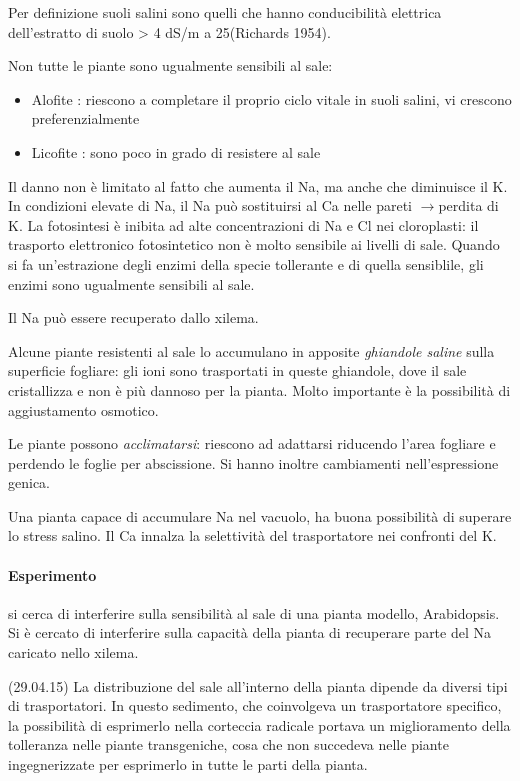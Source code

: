 \documentclass[a4paper,12pt]{book}
\newcommand{\lfreccia}{\ensuremath{\longrightarrow}}
\begin{document}
Per definizione suoli salini sono quelli che hanno
conducibilità elettrica dell’estratto di suolo > 4 dS/m
a 25\textcelsius (Richards 1954).

Non tutte le piante sono ugualmente sensibili al sale: 
\begin{itemize}
\item{Alofite : riescono a completare il proprio ciclo vitale in suoli salini, vi crescono preferenzialmente}
\item{Licofite : sono poco in grado di resistere al sale}
\end{itemize}

Il danno non è limitato al fatto che aumenta il Na, ma anche che diminuisce il K. In condizioni elevate di Na, il Na può sostituirsi al Ca nelle pareti \lfreccia perdita di K. La fotosintesi è inibita ad alte concentrazioni di Na e Cl nei cloroplasti: il trasporto elettronico fotosintetico non è molto sensibile ai livelli di sale. Quando si fa un'estrazione degli enzimi della specie tollerante e di quella sensiblile, gli enzimi sono ugualmente sensibili al sale.

Il Na può essere recuperato dallo xilema.

Alcune piante resistenti al sale lo accumulano in apposite \emph{ghiandole saline} sulla superficie fogliare: gli ioni sono trasportati in queste ghiandole, dove il sale cristallizza e non è più dannoso per la pianta. Molto importante è la possibilità di aggiustamento osmotico.

Le piante possono \emph{acclimatarsi}: riescono ad adattarsi riducendo l'area fogliare e perdendo le foglie per abscissione. Si hanno inoltre cambiamenti nell'espressione genica.

Una pianta capace di accumulare Na nel vacuolo, ha buona possibilità di superare lo stress salino. Il Ca innalza la selettività del trasportatore nei confronti del K. 

\paragraph{Esperimento} si cerca di interferire sulla sensibilità al sale di una pianta modello, Arabidopsis. Si è cercato di interferire sulla capacità della pianta di recuperare parte del Na caricato nello xilema.
 
(29.04.15)
La distribuzione del sale all'interno della pianta dipende da diversi tipi di trasportatori. In questo sedimento, che coinvolgeva un trasportatore specifico, la possibilità di esprimerlo nella corteccia radicale portava un miglioramento della tolleranza nelle piante transgeniche, cosa che non succedeva nelle piante ingegnerizzate per esprimerlo in tutte le parti della pianta. 
\end{document}
